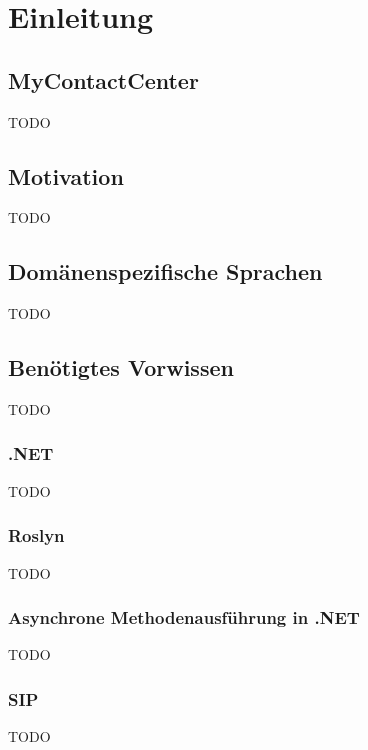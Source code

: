 \chapter{Einleitung}
\label{chap:Einleitung}

\section{MyContactCenter}
TODO

\section{Motivation}
TODO

\section{Domänenspezifische Sprachen}
TODO

\section{Benötigtes Vorwissen}
TODO

\subsection{.NET}
TODO 
 
\subsection{Roslyn}
TODO

\subsection{Asynchrone Methodenausführung in .NET}
TODO

\subsection{SIP}
TODO